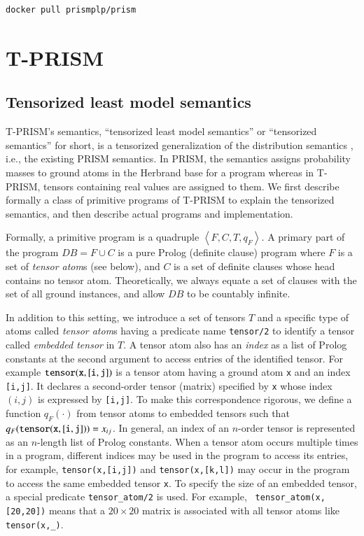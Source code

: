 \documentclass[a4paper]{report}
\newcommand{\db}{\mathit{DB}}
\begin{document}
\begin{verbatim}
docker pull prismplp/prism
\end{verbatim}

\chapter{T-PRISM}
\label{chap:tprism_semantics}




\section{Tensorized least model semantics}

T-PRISM's   semantics,  ``tensorized   least   model  semantics''   or
``tensorized semantics'' for short,  is a tensorized generalization of
the  distribution semantics  \cite{Sato95}, i.e.,  the existing  PRISM
semantics.  In  PRISM, the  semantics  assigns  probability masses  to
ground atoms  in the Herbrand base  for a program whereas  in T-PRISM,
tensors containing real values are assigned to them.
We first describe formally a class of primitive programs of T-PRISM to
explain the  tensorized semantics,  and then describe  actual programs
and implementation.

Formally,   a   primitive   program    is   a   quadruple   $\left\langle
F,C,T,q_F\right\rangle$. A primary part of the program $\db=F \cup C $
is a pure Prolog (definite clause) program  where $F$ is a set of {\em
	tensor atom\/}s  (see below),  and $C$  is a  set of  definite clauses
whose head contains no tensor  atom. Theoretically, we always equate a
set of clauses  with the set of all ground  instances, and allow $\db$
to be countably infinite.

In addition to this  setting, we introduce a set of  tensors $T$ and a
specific type of atoms called  {\em tensor atom\/}s having a predicate
name  {\tt  tensor/2}  to  identify  a  tensor  called  {\em  embedded
	tensor\/} in $T$.  A  tensor atom also has an {\em  index\/} as a list
of Prolog  constants at the second  argument to access entries  of the
identified tensor.   For example  ${\tt tensor(x,[i,j])}$ is  a tensor
atom  having a  ground  atom {\tt  x}  and an  index  {\tt [i,j]}.  It
declares a  second-order tensor  (matrix) specified  by {\tt  x} whose
index $(i,j)$ is expressed by {\tt [i,j]}. To make this correspondence
rigorous,  we define  a  function $q_F(\cdot)$  from  tensor atoms  to
embedded  tensors such  that  $q_F({\tt tensor(x,[i,j])})=x_{ij}$.  In
general,  an  index  of  an  $n$-order tensor  is  represented  as  an
$n$-length  list  of  Prolog  constants. When  a  tensor  atom  occurs
multiple times  in a  program, different  indices may  be used  in the
program to access its entries,  for example, {\tt tensor(x,[i,j])} and
{\tt  tensor(x,[k,l])} may  occur in  the program  to access  the same
embedded tensor {\tt x}.  To specify the size of an embedded tensor, a
special  predicate {\tt  tensor\_atom/2}  is used.  For example,  {\tt
	tensor\_atom(x,[20,20])}  means  that  a  $20  \times  20$  matrix  is
associated with all tensor atoms like {\tt tensor(x,\_)}.
\end{document}

